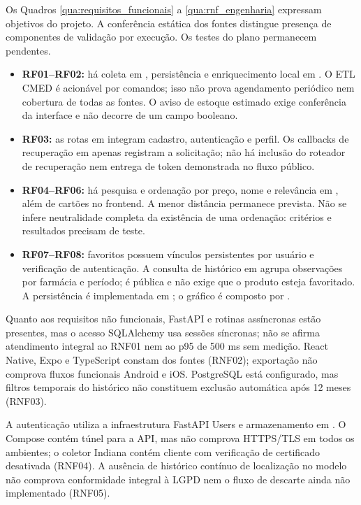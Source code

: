 Os Quadros \ref{qua:requisitos_funcionais} a \ref{qua:rnf_engenharia} expressam objetivos do projeto. A conferência estática dos fontes distingue presença de componentes de validação por execução. Os testes do plano permanecem pendentes.

\begin{itemize}
\item \textbf{RF01--RF02:} há coleta em , persistência e enriquecimento local em . O ETL CMED é acionável por comandos; isso não prova agendamento periódico nem cobertura de todas as fontes. O aviso de estoque estimado exige conferência da interface e não decorre de um campo booleano.
\item \textbf{RF03:} as rotas em  integram cadastro, autenticação e perfil. Os callbacks de recuperação em  apenas registram a solicitação; não há inclusão do roteador de recuperação nem entrega de token demonstrada no fluxo público.
\item \textbf{RF04--RF06:} há pesquisa e ordenação por preço, nome e relevância em , além de cartões no frontend. A menor distância permanece prevista. Não se infere neutralidade completa da existência de uma ordenação: critérios e resultados precisam de teste.
\item \textbf{RF07--RF08:} favoritos possuem vínculos persistentes por usuário e verificação de autenticação. A consulta de histórico em  agrupa observações por farmácia e período; é pública e não exige que o produto esteja favoritado. A persistência é implementada em ; o gráfico é composto por .
\end{itemize}

Quanto aos requisitos não funcionais, FastAPI e rotinas assíncronas estão presentes, mas o acesso SQLAlchemy usa sessões síncronas; não se afirma atendimento integral ao RNF01 nem ao p95 de 500 ms sem medição. React Native, Expo e TypeScript constam dos fontes (RNF02); exportação não comprova fluxos funcionais Android e iOS. PostgreSQL está configurado, mas filtros temporais do histórico não constituem exclusão automática após 12 meses (RNF03).

A autenticação utiliza a infraestrutura FastAPI Users e armazenamento em . O Compose contém túnel para a API, mas não comprova HTTPS/TLS em todos os ambientes; o coletor Indiana contém cliente com verificação de certificado desativada (RNF04). A ausência de histórico contínuo de localização no modelo não comprova conformidade integral à LGPD nem o fluxo de descarte ainda não implementado (RNF05).

